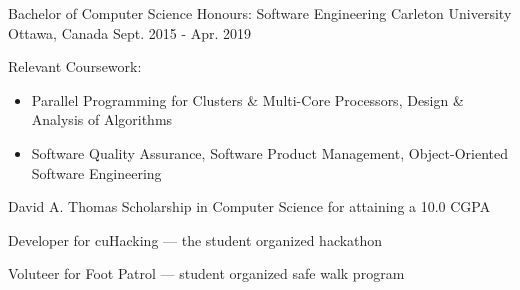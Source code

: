 
\begin{cventries}

  \cventry
    {Bachelor of Computer Science Honours: Software Engineering} %
    {Carleton University} %
    {Ottawa, Canada} %
    {Sept. 2015 - Apr. 2019} %
    {
      \begin{cvitems} %
        \item Relevant Coursework: 
        \begin{itemize}
          \item Parallel Programming for Clusters \& Multi-Core Processors, Design \& Analysis of Algorithms
          \item Software Quality Assurance, Software Product Management, Object-Oriented Software Engineering
        \end{itemize}
        \item David A. Thomas Scholarship in Computer Science for attaining a 10.0 CGPA
        \item Developer for cuHacking --- the student organized hackathon
        \item Voluteer for Foot Patrol --- student organized safe walk program
      \end{cvitems}
    }

\end{cventries}
